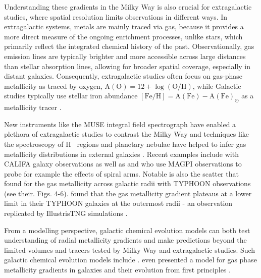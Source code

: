 \documentclass[twocolumn,apj,numberedappendix,appendixfloats,twocolappendix]{openjournal}
\begin{document}
\begin{CJK*}{UTF8}{gbsn}
Understanding these gradients in the Milky Way is also crucial for extragalactic studies, where spatial resolution limits observations in different ways. In extragalactic systems, metals are mainly traced via gas, because it provides a more direct measure of the ongoing enrichment processes, unlike stars, which primarily reflect the integrated chemical history of the past. Observationally, gas emission lines are typically brighter and more accessible across large distances than stellar absorption lines, allowing for broader spatial coverage, especially in distant galaxies. Consequently, extragalactic studies often focus on gas-phase metallicity as traced by oxygen, $\mathrm{A(O)} = 12 + \log(\mathrm{O/H})$, while Galactic studies typically use stellar iron abundance $\mathrm{[Fe/H]} = \mathrm{A(Fe)} - \mathrm{A(Fe)}_\odot$ as a metallicity tracer \citep[e.g.][]{Nicholls2017, FraserMcKelvie2022}.

New instruments like the MUSE integral field spectrograph have enabled a plethora of extragalactic studies to contrast the Milky Way and techniques like the spectroscopy of H~{} regions and planetary nebulae have helped to infer gas metallicity distributions in external galaxies \citep{Shaver1983, Vilchez1996, Rolleston2000, Bresolin2012}. Recent examples include \citet{Sanchez2014} with CALIFA galaxy observations as well as \citet{Mun2024} and \citet{Chen2024} who use MAGPI observations to probe for example the effects of spiral arms. Notable is also the scatter that \citet{Chen2023} found for the gas metallicity across galactic radii with TYPHOON observations (see their. Figs. 4-6). \citet{Grasha2022} found that the gas metallicity gradient plateaus at a lower limit in their TYPHOON galaxies at the outermost radii - an observation replicated by IllustrisTNG simulations \citep{Hemler2021, Garcia2023}.

From a modelling perspective, galactic chemical evolution models can both test understanding of radial metallicity gradients and make predictions beyond the limited volumes and tracers tested by Milky Way and extragalactic studies. Such galactic chemical evolution models include \citet{Chiappini2001, Matteucci2001, Minchev2014b, Kubryk2015, Stanghellini2015, Rybizki2017, Johnson2024}. \citet{Sharda2021} even presented a model for gas phase metallicity gradients in galaxies and their evolution from first principles \citep[see also][]{Krumholz2018b}. 


\end{CJK*}
\end{document}
